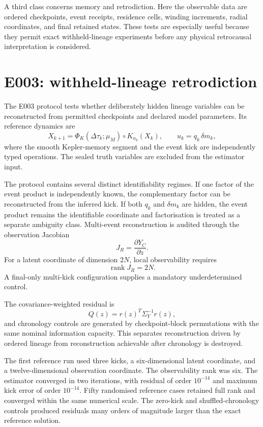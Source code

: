 A third class concerns memory and retrodiction. Here the observable data are ordered checkpoints, event receipts, residence cells, winding increments, radial coordinates, and final retained states. These tests are especially useful because they permit exact withheld-lineage experiments before any physical retrocausal interpretation is considered.

\section{E003: withheld-lineage retrodiction}

The E003 protocol tests whether deliberately hidden lineage variables can be reconstructed from permitted checkpoints and declared model parameters. Its reference dynamics are
\[
X_{k+1}
=
\Phi_K(\Delta\tau_k;\mu_M)
\circ K_{u_k}(X_k),
\qquad
u_k=q_k\,\delta m_k,
\]
where the smooth Kepler-memory segment and the event kick are independently typed operations. The sealed truth variables are excluded from the estimator input.

The protocol contains several distinct identifiability regimes. If one factor of the event product is independently known, the complementary factor can be reconstructed from the inferred kick. If both \(q_k\) and \(\delta m_k\) are hidden, the event product remains the identifiable coordinate and factorisation is treated as a separate ambiguity class. Multi-event reconstruction is audited through the observation Jacobian
\[
J_R=\frac{\partial Y_C}{\partial z}.
\]
For a latent coordinate of dimension \(2N\), local observability requires
\[
\operatorname{rank}J_R=2N.
\]
A final-only multi-kick configuration supplies a mandatory underdetermined control.

The covariance-weighted residual is
\[
Q(z)=r(z)^T\Sigma_Y^{-1}r(z),
\]
and chronology controls are generated by checkpoint-block permutations with the same nominal information capacity. This separates reconstruction driven by ordered lineage from reconstruction achievable after chronology is destroyed.

The first reference run used three kicks, a six-dimensional latent coordinate, and a twelve-dimensional observation coordinate. The observability rank was six. The estimator converged in two iterations, with residual of order \(10^{-14}\) and maximum kick error of order \(10^{-14}\). Fifty randomised reference cases retained full rank and converged within the same numerical scale. The zero-kick and shuffled-chronology controls produced residuals many orders of magnitude larger than the exact reference solution.

